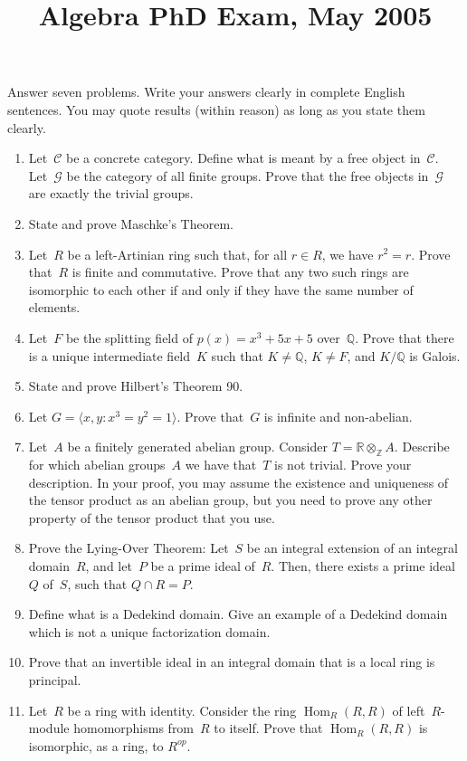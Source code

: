\documentclass[11pt,letterpaper]{article}
\title{Algebra PhD Exam, May 2005}
\author{}
\date{}
\newenvironment{examproblems}[2]{%
  \def\ProblemHeadingTag{#2}%
  \AssignTaggingSocketPlug{block/list/label}{examproblem}%
  \begin{enumerate}%
  \setcounter{enumi}{#1}%
  \renewcommand{\labelenumi}{\textbf{\theenumi.}}%
  \setlength{\topsep}{0.35em}%
  \setlength{\partopsep}{0pt}%
  \setlength{\itemsep}{0.48em}%
  \setlength{\parsep}{0.18em}%
}{\end{enumerate}}
\newenvironment{examinstructions}{%
  \par\begingroup\itshape
}{%
  \par\endgroup\vspace{0.18em}
}
\begin{document}
\maketitle
\thispagestyle{empty}
\begin{examinstructions}
Answer seven problems. Write your answers clearly in complete English sentences. You may quote results (within reason) as long as you state them clearly.
\end{examinstructions}
\begin{examproblems}{0}{H2}
\def\ProblemHeadingText{Problem 1.}
\item
Let~\(\mathcal{C}\) be a concrete category. Define what is meant by a free object in~\(\mathcal{C}\). Let~\(\mathcal{G}\) be the category of all finite groups. Prove that the free objects in~\(\mathcal{G}\) are exactly the trivial groups.
\def\ProblemHeadingText{Problem 2.}
\item
State and prove Maschke’s Theorem.
\def\ProblemHeadingText{Problem 3.}
\item
Let~\(R\) be a left-Artinian ring such that, for all \(r \in R\), we have \(r^2=r\). Prove that~\(R\) is finite and commutative. Prove that any two such rings are isomorphic to each other if and only if they have the same number of elements.
\def\ProblemHeadingText{Problem 4.}
\item
Let~\(F\) be the splitting field of \(p(x)=x^3+5x+5\) over~\(\mathbb{Q}\). Prove that there is a unique intermediate field~\(K\) such that \(K \ne \mathbb{Q}\), \(K \ne F\), and \(K/\mathbb{Q}\) is Galois.
\def\ProblemHeadingText{Problem 5.}
\item
State and prove Hilbert’s Theorem 90.
\def\ProblemHeadingText{Problem 6.}
\item
Let \(G=\langle x,y:x^3=y^2=1\rangle\). Prove that~\(G\) is infinite and non-abelian.
\def\ProblemHeadingText{Problem 7.}
\item
Let~\(A\) be a finitely generated abelian group. Consider \(T=\mathbb{R}\otimes_{\mathbb{Z}}A\). Describe for which abelian groups~\(A\) we have that~\(T\) is not trivial. Prove your description. In your proof, you may assume the existence and uniqueness of the tensor product as an abelian group, but you need to prove any other property of the tensor product that you use.
\def\ProblemHeadingText{Problem 8.}
\item
Prove the Lying-Over Theorem: Let~\(S\) be an integral extension of an integral domain~\(R\), and let~\(P\) be a prime ideal of~\(R\). Then, there exists a prime ideal~\(Q\) of~\(S\), such that \(Q\cap R=P\).
\def\ProblemHeadingText{Problem 9.}
\item
Define what is a Dedekind domain. Give an example of a Dedekind domain which is not a unique factorization domain.
\def\ProblemHeadingText{Problem 10.}
\item
Prove that an invertible ideal in an integral domain that is a local ring is principal.
\def\ProblemHeadingText{Problem 11.}
\item
Let~\(R\) be a ring with identity. Consider the ring \(\operatorname{Hom}_R(R,R)\) of left~\(R\)-module homomorphisms from~\(R\) to itself. Prove that \(\operatorname{Hom}_R(R,R)\) is isomorphic, as a ring, to \(R^{op}\).
\end{examproblems}
\end{document}
